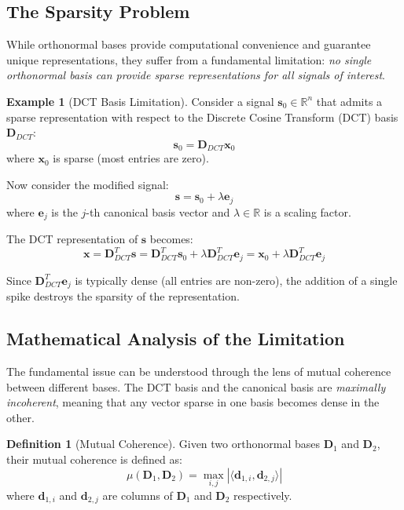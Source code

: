 \documentclass[12pt]{article}
\renewcommand{\vec}[1]{\mathbf{#1}}
\newcommand{\R}{\mathbb{R}}
\theoremstyle{definition}
\newtheorem{definition}[theorem]{Definition}
\newtheorem{example}[theorem]{Example}
\begin{document}
\subsection{The Sparsity Problem}

While orthonormal bases provide computational convenience and guarantee unique representations, they suffer from a fundamental limitation: \textit{no single orthonormal basis can provide sparse representations for all signals of interest}.

\begin{example}[DCT Basis Limitation]
    Consider a signal $\vec{s}_0 \in \R^n$ that admits a sparse representation with respect to the Discrete Cosine Transform (DCT) basis $\mathbf{D}_{DCT}$:
    \begin{equation}
        \vec{s}_0 = \mathbf{D}_{DCT} \vec{x}_0
    \end{equation}
    where $\vec{x}_0$ is sparse (most entries are zero).

    Now consider the modified signal:
    \begin{equation}
        \vec{s} = \vec{s}_0 + \lambda \vec{e}_j
    \end{equation}
    where $\vec{e}_j$ is the $j$-th canonical basis vector and $\lambda \in \R$ is a scaling factor.

    The DCT representation of $\vec{s}$ becomes:
    \begin{equation}
        \vec{x} = \mathbf{D}_{DCT}^T \vec{s} = \mathbf{D}_{DCT}^T \vec{s}_0 + \lambda \mathbf{D}_{DCT}^T \vec{e}_j = \vec{x}_0 + \lambda \mathbf{D}_{DCT}^T \vec{e}_j
    \end{equation}

    Since $\mathbf{D}_{DCT}^T \vec{e}_j$ is typically dense (all entries are non-zero), the addition of a single spike destroys the sparsity of the representation.
\end{example}

\subsection{Mathematical Analysis of the Limitation}

The fundamental issue can be understood through the lens of mutual coherence between different bases. The DCT basis and the canonical basis are \textit{maximally incoherent}, meaning that any vector sparse in one basis becomes dense in the other.

\begin{definition}[Mutual Coherence]
    Given two orthonormal bases $\mathbf{D}_1$ and $\mathbf{D}_2$, their mutual coherence is defined as:
    \begin{equation}
        \mu(\mathbf{D}_1, \mathbf{D}_2) = \max_{i,j} |\langle \vec{d}_{1,i}, \vec{d}_{2,j} \rangle|
    \end{equation}
    where $\vec{d}_{1,i}$ and $\vec{d}_{2,j}$ are columns of $\mathbf{D}_1$ and $\mathbf{D}_2$ respectively.
\end{definition}
\end{document}
